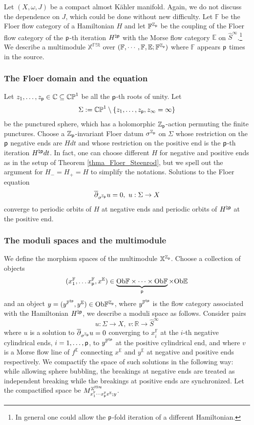 \documentclass[reqno, 10pt]{amsart}
\numberwithin{equation}{section}
\numberwithin{equation}{section}
\renewcommand{\subset}{\subseteq}
\theoremstyle{definition}
\theoremstyle{remark}
\newcommand{\beqn}{\begin{equation*}}
\newcommand{\eeqn}{\end{equation*}}
\newcommand{\ov}{\overline}
\newcommand{\mb}{\mathbb}
\newcommand{\p}{{\sf p}}
\newcommand{\zp}{{{\mb Z}_{\sf p}}}
\newcommand{\ep}{{{\mathbb E}}}
\newcommand{\wh}{\widehat}
\begin{document}
Let $(X, \omega, J)$ be a compact almost K\"ahler manifold. Again, we do not discuss the dependence on $J$, which could be done without new difficulty. Let ${\mb F}$ be the Floer flow category of a Hamiltonian $H$ and let ${\mb F}^\zp$ be the coupling of the Floer flow category of the $\p$-th iteration $H^{\natural \p}$ with the Morse flow category $\ep$ on $\wh S^\infty$.\footnote{In general one could allow the $\p$-fold iteration of a different Hamiltonian.} We describe a multimodule $\mb{X}^{\mb{FSt}}$ over $({\mb F}, \cdots, {\mb F}, \ep; {\mb F}^\zp)$ where ${\mb F}$ appears $\p$ times in the source.

\subsubsection{The Floer domain and the equation}

Let $z_1, \ldots, z_{\p}\in  {\mb C} \subset \mb{CP}^1$ be all the $\p$-th roots of unity. Let 
\beqn
\Sigma:= \mb{CP}^1 \setminus \{z_1, \ldots, z_{\p}, z_\infty = \infty \}
\eeqn
be the punctured sphere, which has a holomorphic $\zp$-action permuting the finite punctures. Choose a $\zp$-invariant Floer datum $\sigma^{\zp}$ on $\Sigma$ whose restriction on the $\p$ negative ends are $H dt$ and whose restriction on the positive end is the $\p$-th iteration $H^{\natural \p} dt$. In fact, one can choose different $H$ for negative and positive ends as in the setup of Theorem \ref{thma_Floer_Steenrod}, but we spell out the argument for $H_- = H_+ = H$ to simplify the notations. Solutions to the Floer equation
\beqn
\ov\partial_{\sigma^{\zp}} u = 0,\ u: \Sigma \to X
\eeqn
converge to periodic orbits of $H$ at negative ends and periodic orbits of $H^{\natural \p}$ at the positive end. 

\subsubsection{The moduli spaces and the multimodule}

We define the morphism spaces of the multimodule ${\mb X}^\zp$. Choose a collection of objects
\beqn
(x_1^{\mb F}, \ldots x_\p^{\mb F}, x^\ep) \in \underbrace{{\rm Ob} {\mb F} \times \cdots \times {\rm Ob}{\mb F}}_{\p} \times {\rm Ob} {\mb E}
\eeqn
and an object $y = (y^{\mb{F}^{\natural \p}}, y^\ep) \in {\rm Ob} {\mb F}^\zp$, where $y^{\mb{F}^{\natural \p}}$ is the flow category associated with the Hamiltonian $H^{\natural \p}$, we describe a moduli space as follows. Consider pairs
\beqn
u: \Sigma \to X,\ v: {\mb R} \to \wh S^\infty
\eeqn
where $u$ is a solution to $\ov\partial_{\sigma^{\zp}} u = 0$ converging to $x_i^{\mb F}$ at the $i$-th negative cylindrical ends, $i = 1, \ldots, \p$, to $y^{\mb{F}^{\natural \p}}$ at the positive cylindrical end, and where $v$ is a Morse flow line of $f^\ep$ connecting $x^\ep$ and $y^\ep$ at negative and positive ends respectively. We compactify the space of such solutions in the following way: while allowing sphere bubbling, the breakings at negative ends are treated as independent breaking while the breakings at positive ends are synchronized. Let the compactified space be $M_{x_1^{\mb F}\cdots x_\p^{\mb F} x^\ep; y}^{{\mb X}^{\mb{FSt}}}$.
\end{document}
